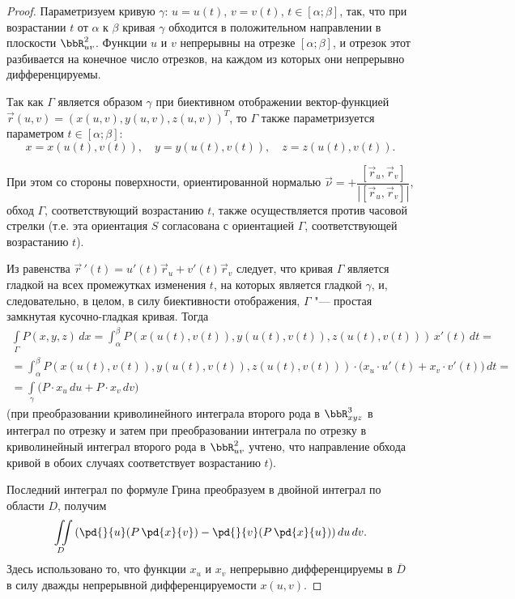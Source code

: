 \begin{proof}
Параметризуем кривую $\gamma$: $u = u(t)$, $v = v(t)$, $t \in [\alpha; \beta]$, так, что при возрастании $t$ от $\alpha$ к $\beta$ кривая $\gamma$ обходится в положительном направлении в плоскости $\bbR^2_{uv}$. Функции $u$ и $v$ непрерывны на отрезке $[\alpha; \beta]$, и отрезок этот разбивается на конечное число отрезков, на каждом из которых они непрерывно дифференцируемы.

Так как $\Gamma$ является образом $\gamma$ при биективном отображении вектор-функцией $\vec{r}(u, v) = (x(u, v), y(u, v), z(u, v))^T$, то $\Gamma$ также параметризуется параметром $t \in [\alpha; \beta]$:
$$
x = x(u(t), v(t)), \quad y = y(u(t), v(t)), \quad z = z(u(t), v(t)).
$$

При этом со стороны поверхности, ориентированной нормалью $\vec{\nu} = +\dfrac{[\vec{r}_u, \vec{r}_v]}{|[\vec{r}_u, \vec{r}_v]|}$, обход $\Gamma$, соответствующий возрастанию $t$, также осуществляется против часовой стрелки (т.е. эта ориентация $S$ согласована с ориентацией $\Gamma$, соответствующей возрастанию $t$).

Из равенства $\vec{r}\,'(t) = u'(t)\vec{r}_u + v'(t)\vec{r}_v$ следует, что кривая $\Gamma$ является гладкой на всех промежутках изменения $t$, на которых является гладкой $\gamma$, и, следовательно, в целом, в силу биективности отображения, $\Gamma$ "--- простая замкнутая кусочно-гладкая кривая. Тогда
\begin{multline*}
\int\limits_{\Gamma} P(x, y, z)\,dx = \int_{\alpha}^{\beta} P(x(u(t), v(t)), y(u(t), v(t)), z(u(t), v(t)))\,x'(t)\,dt = \\
= \int_{\alpha}^{\beta} P(x(u(t), v(t)), y(u(t), v(t)), z(u(t), v(t))) \cdot \bigl(x_u \cdot u'(t) + x_v \cdot v'(t)\bigr)\,dt = \\
= \int\limits_{\gamma} \bigl(P \cdot x_u\,du + P \cdot x_v\,dv\bigr)
\end{multline*}
(при преобразовании криволинейного интеграла второго рода в $\bbR^3_{xyz}$ в интеграл по отрезку и затем при преобразовании интеграла по отрезку в криволинейный интеграл второго рода в $\bbR^2_{uv}$ учтено, что направление обхода кривой в обоих случаях соответствует возрастанию $t$).

Последний интеграл по формуле Грина преобразуем в двойной интеграл по области $D$, получим
$$
\iint\limits_{D} \left(\pd{}{u}\!\left(P\,\pd{x}{v}\right) - \pd{}{v}\!\left(P\,\pd{x}{u}\right)\right) du\,dv.
$$
Здесь использовано то, что функции $x_u$ и $x_v$ непрерывно дифференцируемы в $\overline{D}$ в силу дважды непрерывной дифференцируемости $x(u, v)$.


\end{proof}

